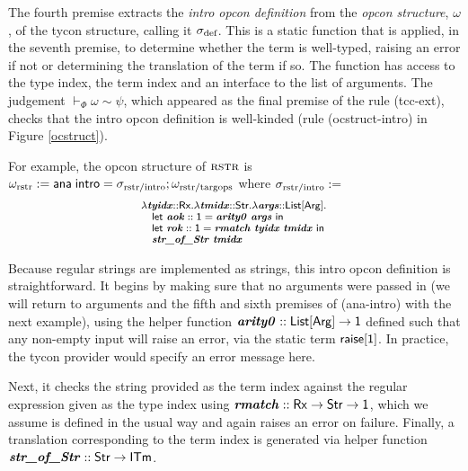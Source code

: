 \documentclass[10pt,preprint]{sigplanconf}
\begin{document}
The fourth premise extracts the \emph{intro opcon definition} from the \emph{opcon structure}, $\omega$, of the tycon structure, calling it $\sigma_\text{def}$. This is a static function that is applied, in the seventh premise, to determine whether the term is well-typed, raising an error if not or determining the translation of the term if so. The function has access to the type index, the term index and an interface to the list of arguments. The  judgement $\vdash_\Phi \omega \sim \psi$, which appeared as the final premise of the rule (tcc-ext),  checks that the intro opcon definition is well-kinded (rule (ocstruct-intro) in Figure \ref{ocstruct}). 

For example, the opcon structure of $\textsc{rstr}$ is  $\small\omega_\text{rstr} := \tcstructn{\stx{rstr/intro}}; \omega_\text{rstr/targops}$ where $\small\stx{rstr/intro}:=$
\[\small\begin{array}{l}
    \slam{\krx}{\svar{tyidx}}{\slam{\kstr}{\svar{tmidx}}{\slam{\kargs}{\svar{args}}{\\
\quad \keyw{let}~\svar{aok} :: \kunit = \svar{arity0}~\svar{args}~\keyw{in}~\\
\quad \keyw{let}~\svar{rok} :: \kunit = \svar{rmatch}~\svar{tyidx}~\svar{tmidx}~\keyw{in}~\\
\quad \svar{str\_of\_Str}~\svar{tmidx}
}}}
\end{array}\]

Because regular strings are implemented as strings, this intro opcon definition is straightforward. It begins by making sure that no arguments were passed in (we will return to arguments and the fifth and sixth premises of (ana-intro) with the next example), using the helper function $\svar{arity0} :: \kargs \rightarrow \kunit$ defined such that any non-empty input will raise an error, via the static term ${\sf raise}[{\sf 1}]$. In practice, the tycon provider would specify an error message here.%



Next, it checks the string provided as the term index against the regular expression given as the type index using ${\textbf{\textit{rmatch}}} :: {\sf Rx} \rightarrow {\sf Str} \rightarrow {\sf 1}$, which we assume is defined in the usual way and again raises an error on failure. Finally, a {translation} corresponding to the term index is generated via  helper function $\svar{str\_of\_Str} :: \keyw{Str} \rightarrow \kitm$.%
\end{document}
